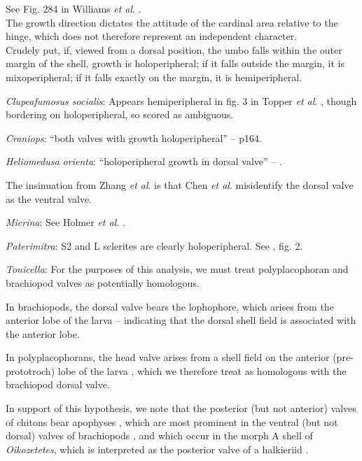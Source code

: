 \documentclass[openany]{book}
\theoremstyle{definition}
\theoremstyle{definition}
\theoremstyle{definition}
\theoremstyle{remark}
\begin{document}
See Fig. 284 in Williams \emph{et al}.
\citeyearpar{Williams1997Introduction}.\\
The growth direction dictates the attitude of the cardinal area relative
to the hinge, which does not therefore represent an independent
character.\\
Crudely put, if, viewed from a dorsal position, the umbo falls within
the outer margin of the shell, growth is holoperipheral; if it falls
outside the margin, it is mixoperipheral; if it falls exactly on the
margin, it is hemiperipheral.

\hypertarget{Clupeafumosus_socialis-coding-75}{}
\emph{Clupeafumosus socialis}: Appears hemiperipheral in fig. 3 in
Topper \emph{et al}. \citeyearpar{Topper2013Reappraisalof}, though
bordering on holoperipheral, so scored as ambiguous.

\hypertarget{Craniops-coding-75}{}
\emph{Craniops}: ``both valves with growth holoperipheral'' --
\citet{Williams2000LinguliformeaCraniiformea} p164.

\hypertarget{Heliomedusa_orienta-coding-75}{}
\emph{Heliomedusa orienta}: ``holoperipheral growth in dorsal valve'' --
\citet{Williams2007Supplement}.

The insinuation from Zhang \emph{et al}.
\citeyearpar{Zhang2009Architectureand} is that Chen \emph{et al}.
\citeyearpar{Chen2007Reinterpretationof} misidentify the dorsal valve as
the ventral valve.

\hypertarget{Micrina-coding-75}{}
\emph{Micrina}: See Holmer \emph{et al}.
\citeyearpar{Holmer2008TheEarly}.

\hypertarget{Paterimitra-coding-75}{}
\emph{Paterimitra}: S2 and L sclerites are clearly holoperipheral. See
\citet{Larsson2014iPaterimitra}, fig. 2.

\hypertarget{Tonicella-coding-75}{}
\emph{Tonicella}: For the purposes of this analysis, we must treat
polyplacophoran and brachiopod valves as potentially homologous.

In brachiopods, the dorsal valve bears the lophophore, which arises from
the anterior lobe of the larva \citep{Altenburger2013} -- indicating
that the dorsal shell field is associated with the anterior lobe.

In polyplacophorans, the head valve arises from a shell field on the
anterior (pre-prototroch) lobe of the larva \citep{Wanninger2002C},
which we therefore treat as homologous with the brachiopod dorsal valve.

In support of this hypothesis, we note that the posterior (but not
anterior) valves of chitons bear apophyses
\citep{Schwabe2010, Connors2012}, which are most prominent in the
ventral (but not dorsal) valves of brachiopods \citep[fig.
322]{Williams1997Introduction}, and which occur in the morph A shell of
\emph{Oikozetetes}, which is interpreted as the posterior valve of a
halkieriid \citep{Paterson2009}.
\end{document}
